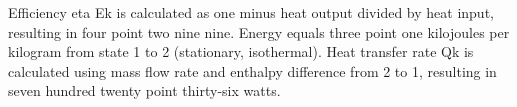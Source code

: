 Efficiency eta Ek is calculated as one minus heat output divided by heat input, resulting in four point two nine nine. Energy equals three point one kilojoules per kilogram from state 1 to 2 (stationary, isothermal). Heat transfer rate Qk is calculated using mass flow rate and enthalpy difference from 2 to 1, resulting in seven hundred twenty point thirty-six watts.